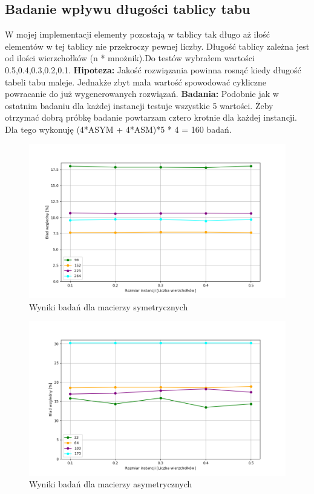 \documentclass{article}
\begin{document}
      \subsection{Badanie wpływu długości tablicy tabu} 
        W mojej implementacji elementy pozostają w tablicy tak długo aż 
        ilość elementów w tej tablicy nie przekroczy pewnej liczby. Długość
        tablicy zależna jest od ilości wierzchołków (n * mnożnik).Do testów
        wybrałem wartości 0.5,0.4,0.3,0.2,0.1.\linebreak
        \textbf{Hipoteza: } Jakość rozwiązania powinna rosnąć kiedy długość
        tabeli tabu maleje. Jednakże zbyt mała wartość spowodować cykliczne 
        powracanie do już wygenerowanych rozwiązań.\linebreak
        \textbf{Badania: } Podobnie jak w ostatnim badaniu dla każdej instancji 
        testuje wszystkie 5 wartości. Żeby otrzymać dobrą próbkę badanie 
        powtarzam cztero krotnie dla każdej instancji. Dla tego wykonuję 
        (4*ASYM + 4*ASM)*5 * 4 = 160 badań.\linebreak
        
        \FloatBarrier
        \begin{figure}[ht]
          \centering
          \includegraphics[width=\textwidth]{src/plots/symTsTabuLen.png}
          \caption{Wyniki badań dla macierzy symetrycznych}
          \label{fig:symTabuLen}
        \end{figure}
        \begin{figure}[ht]
          \centering
          \includegraphics[width=\textwidth]{src/plots/asymTsTabuLen.png}
          \caption{Wyniki badań dla macierzy asymetrycznych}
          \label{fig:asymTabuLen}
        \end{figure}
\end{document}
